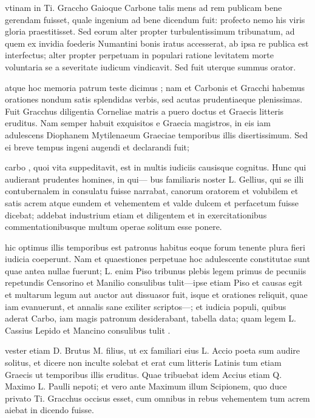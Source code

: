  vtinam in Ti. Graccho Gaioque Carbone talis mens ad rem publicam bene gerendam fuisset, quale ingenium ad bene dicendum fuit: profecto nemo his viris gloria praestitisset. Sed eorum alter propter turbulentissimum tribunatum, ad quem ex invidia foederis Numantini bonis iratus accesserat, ab ipsa re publica est interfectus; alter propter perpetuam in populari ratione levitatem morte voluntaria se a severitate iudicum vindicavit. Sed fuit uterque summus orator.

 atque hoc memoria patrum teste dicimus ; nam et Carbonis et Gracchi habemus orationes nondum satis splendidas verbis, sed acutas prudentiaeque plenissimas. Fuit Gracchus diligentia Corneliae matris a puero doctus et Graecis litteris eruditus. Nam semper habuit exquisitos e Graecia magistros, in eis iam adulescens Diophanem Mytilenaeum Graeciae temporibus illis disertissimum. Sed ei breve tempus ingeni augendi et declarandi fuit;

 carbo , quoi vita suppeditavit, est in multis iudiciis causisque cognitus. Hunc qui audierant prudentes homines, in qui— bus familiaris noster L. Gellius, qui se illi contubernalem in consulatu fuisse narrabat, canorum oratorem et volubilem et satis acrem atque eundem et vehementem et valde dulcem et perfacetum fuisse dicebat; addebat industrium etiam et diligentem et in exercitationibus commentationibusque multum operae solitum esse ponere.

 hic optimus illis temporibus est patronus habitus eoque forum tenente plura fieri iudicia coeperunt. Nam et quaestiones perpetuae hoc adulescente constitutae sunt quae antea nullae fuerunt; L. enim Piso tribunus plebis legem primus de pecuniis repetundis Censorino et Manilio consulibus tulit—ipse etiam Piso et causas egit et multarum legum aut auctor aut dissuasor fuit, isque et orationes reliquit, quae iam evanuerunt, et annalis sane exiliter scriptos—; et iudicia populi, quibus aderat Carbo, iam magis patronum desiderabant, tabella data; quam legem L. Cassius Lepido et Mancino consulibus tulit .

 vester etiam D. Brutus M. filius, ut ex familiari eius L. Accio poeta sum audire solitus, et dicere non inculte solebat et erat cum litteris Latinis tum etiam Graecis ut temporibus illis eruditus. Quae tribuebat idem Accius etiam Q. Maximo L. Paulli nepoti; et vero ante Maximum illum Scipionem, quo duce privato Ti. Gracchus occisus esset, cum omnibus in rebus vehementem tum acrem aiebat in dicendo fuisse.

